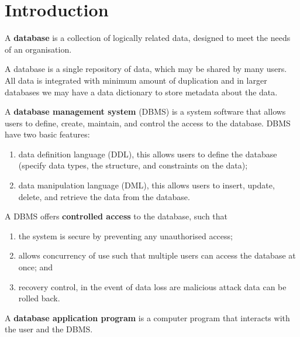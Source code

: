 \chapter{Introduction}

\begin{definition}[Database]
    A \textbf{database} is a collection of logically related data, designed to meet the needs of an organisation.
\end{definition}

A database is a single repository of data, which may be shared by many users. All data is integrated with minimum amount of duplication and in larger databases we may have a data dictionary to store metadata about the data.

\begin{definition}
    A \textbf{database management system} (DBMS) is a system software that allows users to define, create, maintain, and control the access to the database. DBMS have two basic features:
    
    \begin{enumerate}
        \item data definition language (DDL), this allows users to define the database (specify data types, the structure, and constraints on the data);
        
        \item data manipulation language (DML), this allows users to insert, update, delete, and retrieve the data from the database.
    \end{enumerate}
\end{definition}

A DBMS offers \textbf{controlled access} to the database, such that

\begin{enumerate}
    \item the system is secure by preventing any unauthorised access;
    
    \item allows concurrency of use such that multiple users can access the database at once; and
    
    \item recovery control, in the event of data loss are malicious attack data can be rolled back.
\end{enumerate}

\begin{definition}
    A \textbf{database application program} is a computer program that interacts with the user and the DBMS.
\end{definition}


